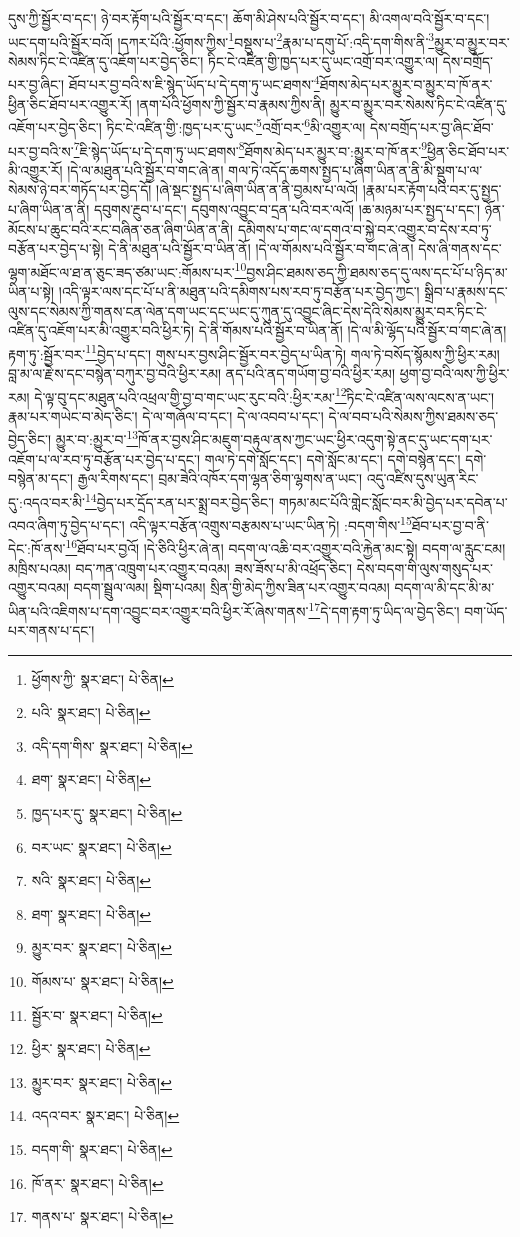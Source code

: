 དུས་ཀྱི་སྦྱོར་བ་དང་། ཉེ་བར་རྟོག་པའི་སྦྱོར་བ་དང་། ཆོག་མི་ཤེས་པའི་སྦྱོར་བ་དང་། མི་འགལ་བའི་སྦྱོར་བ་དང་། ཡང་དག་པའི་སྦྱོར་བའོ། །དཀར་པོའི་:ཕྱོགས་ཀྱིས་\footnote{ཕྱོགས་ཀྱི་  སྣར་ཐང་།  པེ་ཅིན། }བསྡུས་པ་\footnote{པའི་  སྣར་ཐང་།  པེ་ཅིན། }རྣམ་པ་དགུ་པོ་:འདི་དག་གིས་ནི་\footnote{འདི་དག་གིས་  སྣར་ཐང་།  པེ་ཅིན། }མྱུར་བ་མྱུར་བར་སེམས་ཏིང་ངེ་འཛིན་དུ་འཇོག་པར་བྱེད་ཅིང་། ཏིང་ངེ་འཛིན་གྱི་ཁྱད་པར་དུ་ཡང་འགྲོ་བར་འགྱུར་ལ། དེས་བགྲོད་པར་བྱ་ཞིང་། ཐོབ་པར་བྱ་བའི་ས་ཇི་སྙེད་ཡོད་པ་དེ་དག་ཏུ་ཡང་ཐགས་\footnote{ཐག་  སྣར་ཐང་།  པེ་ཅིན། }ཐོགས་མེད་པར་མྱུར་བ་མྱུར་བ་ཁོ་ནར་ཕྱིན་ཅིང་ཐོབ་པར་འགྱུར་རོ། །ནག་པོའི་ཕྱོགས་ཀྱི་སྦྱོར་བ་རྣམས་ཀྱིས་ནི། མྱུར་བ་མྱུར་བར་སེམས་ཏིང་ངེ་འཛིན་དུ་འཇོག་པར་བྱེད་ཅིང་། ཏིང་ངེ་འཛིན་གྱི་:ཁྱད་པར་དུ་ཡང་\footnote{ཁྱད་པར་དུ་  སྣར་ཐང་།  པེ་ཅིན། }འགྲོ་བར་\footnote{བར་ཡང་  སྣར་ཐང་།  པེ་ཅིན། }མི་འགྱུར་ལ། དེས་བགྲོད་པར་བྱ་ཞིང་ཐོབ་པར་བྱ་བའི་ས་\footnote{སའི་  སྣར་ཐང་།  པེ་ཅིན། }ཇི་སྙེད་ཡོད་པ་དེ་དག་ཏུ་ཡང་ཐགས་\footnote{ཐག་  སྣར་ཐང་།  པེ་ཅིན། }ཐོགས་མེད་པར་མྱུར་བ་:མྱུར་བ་ཁོ་ནར་\footnote{མྱུར་བར་  སྣར་ཐང་།  པེ་ཅིན། }ཕྱིན་ཅིང་ཐོབ་པར་མི་འགྱུར་རོ། །དེ་ལ་མཐུན་པའི་སྦྱོར་བ་གང་ཞེ་ན། གལ་ཏེ་འདོད་ཆགས་སྤྱད་པ་ཞིག་ཡིན་ན་ནི་མི་སྡུག་པ་ལ་སེམས་ཉེ་བར་གཏོད་པར་བྱེད་དོ། །ཞེ་སྡང་སྤྱད་པ་ཞིག་ཡིན་ན་ནི་བྱམས་པ་ལའོ། །རྣམ་པར་རྟོག་པའི་བར་དུ་སྤྱད་པ་ཞིག་ཡིན་ན་ནི། དབུགས་རྔུབ་པ་དང་། དབུགས་འབྱུང་བ་དྲན་པའི་བར་ལའོ། །ཆ་མཉམ་པར་སྤྱད་པ་དང་། ཉོན་མོངས་པ་ཆུང་བའི་རང་བཞིན་ཅན་ཞིག་ཡིན་ན་ནི། དམིགས་པ་གང་ལ་དགའ་བ་སྐྱེ་བར་འགྱུར་བ་དེས་རབ་ཏུ་བརྩོན་པར་བྱེད་པ་སྟེ། དེ་ནི་མཐུན་པའི་སྦྱོར་བ་ཡིན་ནོ། །དེ་ལ་གོམས་པའི་སྦྱོར་བ་གང་ཞེ་ན། དེས་ཞི་གནས་དང་ལྷག་མཐོང་ལ་ཐ་ན་ཅུང་ཟད་ཙམ་ཡང་:གོམས་པར་\footnote{གོམས་པ་  སྣར་ཐང་།  པེ་ཅིན། }བྱས་ཤིང་ཐམས་ཅད་ཀྱི་ཐམས་ཅད་དུ་ལས་དང་པོ་པ་ཉིད་མ་ཡིན་པ་སྟེ། །འདི་ལྟར་ལས་དང་པོ་པ་ནི་མཐུན་པའི་དམིགས་པས་རབ་ཏུ་བརྩོན་པར་བྱེད་ཀྱང་། སྒྲིབ་པ་རྣམས་དང་ལུས་དང་སེམས་ཀྱི་གནས་ངན་ལེན་དག་ཡང་དང་ཡང་དུ་ཀུན་དུ་འབྱུང་ཞིང་དེས་དེའི་སེམས་མྱུར་བར་ཏིང་ངེ་འཛིན་དུ་འཇོག་པར་མི་འགྱུར་བའི་ཕྱིར་ཏེ། དེ་ནི་གོམས་པའི་སྦྱོར་བ་ཡིན་ནོ། །དེ་ལ་མི་ལྷོད་པའི་སྦྱོར་བ་གང་ཞེ་ན། རྟག་ཏུ་:སྦྱོར་བར་\footnote{སྦྱོར་བ་  སྣར་ཐང་།  པེ་ཅིན། }བྱེད་པ་དང་། གུས་པར་བྱས་ཤིང་སྦྱོར་བར་བྱེད་པ་ཡིན་ཏེ། གལ་ཏེ་བསོད་སྙོམས་ཀྱི་ཕྱིར་རམ། བླ་མ་ལ་རྗེ་ས་དང་བསྙེན་བཀུར་བྱ་བའི་ཕྱིར་རམ། ནད་པའི་ནད་གཡོག་བྱ་བའི་ཕྱིར་རམ། ཕྱག་བྱ་བའི་ལས་ཀྱི་ཕྱིར་རམ། དེ་ལྟ་བུ་དང་མཐུན་པའི་འཕྲལ་གྱི་བྱ་བ་གང་ཡང་རུང་བའི་:ཕྱིར་རམ་\footnote{ཕྱིར་  སྣར་ཐང་།  པེ་ཅིན། }ཏིང་ངེ་འཛིན་ལས་ལངས་ན་ཡང་། རྣམ་པར་གཡེང་བ་མེད་ཅིང་། དེ་ལ་གཞོལ་བ་དང་། དེ་ལ་འབབ་པ་དང་། དེ་ལ་བབ་པའི་སེམས་ཀྱིས་ཐམས་ཅད་བྱེད་ཅིང་། མྱུར་བ་:མྱུར་བ་\footnote{མྱུར་བར་  སྣར་ཐང་།  པེ་ཅིན། }ཁོ་ནར་བྱས་ཤིང་མཇུག་བརྟུལ་ནས་ཀྱང་ཡང་ཕྱིར་འདུག་སྟེ་ནང་དུ་ཡང་དག་པར་འཇོག་པ་ལ་རབ་ཏུ་བརྩོན་པར་བྱེད་པ་དང་། གལ་ཏེ་དགེ་སློང་དང་། དགེ་སློང་མ་དང་། དགེ་བསྙེན་དང་། དགེ་བསྙེན་མ་དང་། རྒྱལ་རིགས་དང་། བྲམ་ཟེའི་འཁོར་དག་ལྷན་ཅིག་ལྷགས་ན་ཡང་། འདུ་འཛིས་དུས་ཡུན་རིང་དུ་:འདའ་བར་མི་\footnote{འདའ་བར་  སྣར་ཐང་།  པེ་ཅིན། }བྱེད་པར་དྲོད་རན་པར་སྨྲ་བར་བྱེད་ཅིང་། གཏམ་མང་པོའི་གླེང་སློང་བར་མི་བྱེད་པར་དབེན་པ་འབའ་ཞིག་ཏུ་བྱེད་པ་དང་། འདི་ལྟར་བརྩོན་འགྲུས་བརྩམས་པ་ཡང་ཡིན་ཏེ། :བདག་གིས་\footnote{བདག་གི་  སྣར་ཐང་།  པེ་ཅིན། }ཐོབ་པར་བྱ་བ་ནི་དེང་:ཁོ་ནས་\footnote{ཁོ་ནར་  སྣར་ཐང་།  པེ་ཅིན། }ཐོབ་པར་བྱའོ། །དེ་ཅིའི་ཕྱིར་ཞེ་ན། བདག་ལ་འཆི་བར་འགྱུར་བའི་རྐྱེན་མང་སྟེ། བདག་ལ་རླུང་ངམ། མཁྲིས་པའམ། བད་ཀན་འཁྲུག་པར་འགྱུར་བའམ། ཟས་ཟོས་པ་མི་འཕྲོད་ཅིང་། དེས་བདག་གི་ལུས་གསུད་པར་འགྱུར་བའམ། བདག་སྦྲུལ་ལམ། སྡིག་པའམ། སྲིན་གྱི་མེད་ཀྱིས་ཟིན་པར་འགྱུར་བའམ། བདག་ལ་མི་དང་མི་མ་ཡིན་པའི་འཇིགས་པ་དག་འབྱུང་བར་འགྱུར་བའི་ཕྱིར་རོ་ཞེས་གནས་\footnote{གནས་པ་  སྣར་ཐང་།  པེ་ཅིན། }དེ་དག་རྟག་ཏུ་ཡིད་ལ་བྱེད་ཅིང་། བག་ཡོད་པར་གནས་པ་དང་། 